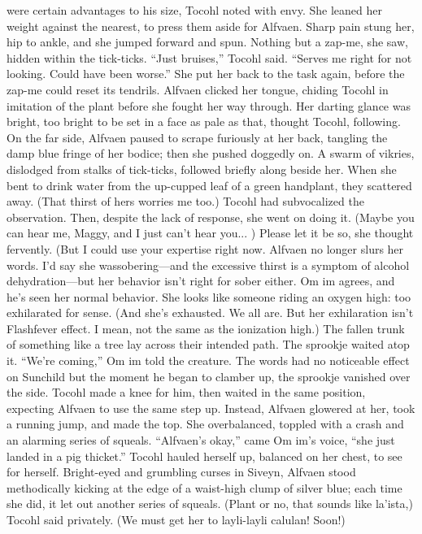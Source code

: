 \documentclass[9pt]{article}
\begin{document}
were certain advantages to his size, Tocohl noted with envy. She leaned her weight against the nearest, to
press them aside for Alfvaen. Sharp pain stung her, hip to ankle, and she jumped forward and spun.
Nothing but a zap-me, she saw, hidden within the tick-ticks. “Just bruises,” Tocohl said. “Serves me right
for not looking. Could have been worse.” She put her back to the task again, before the zap-me could
reset its tendrils.
Alfvaen clicked her tongue, chiding Tocohl in imitation of the plant before she fought her way
through. Her darting glance was bright, too bright to be set in a face as pale as that, thought Tocohl,
following.
On the far side, Alfvaen paused to scrape furiously at her back, tangling the damp blue fringe of her
bodice; then she pushed doggedly on. A swarm of vikries, dislodged from stalks of tick-ticks, followed
briefly along beside her. When she bent to drink water from the up-cupped leaf of a green handplant,
they scattered away.
(That thirst of hers worries me too.) Tocohl had subvocalized the observation. Then, despite the lack
of response, she went on doing it. (Maybe you can hear me, Maggy, and I just can’t hear you... ) Please
let it be so, she thought fervently.
(But I could use your expertise right now. Alfvaen no longer slurs her words. I’d say she wassobering—and the excessive thirst is a symptom of alcohol dehydration—but her behavior isn’t right for
sober either. Om im agrees, and he’s seen her normal behavior. She looks like someone riding an oxygen
high: too exhilarated for sense.
(And she’s exhausted. We all are. But her exhilaration isn’t Flashfever effect. I mean, not the same as
the ionization high.)
The fallen trunk of something like a tree lay across their intended path. The sprookje waited atop it.
“We’re coming,” Om im told the creature. The words had no noticeable effect on Sunchild but the
moment he began to clamber up, the sprookje vanished over the side. Tocohl made a knee for him, then
waited in the same position, expecting Alfvaen to use the same step up.
Instead, Alfvaen glowered at her, took a running jump, and made the top. She overbalanced, toppled
with a crash and an alarming series of squeals. “Alfvaen’s okay,” came Om im’s voice, “she just landed
in a pig thicket.”
Tocohl hauled herself up, balanced on her chest, to see for herself. Bright-eyed and grumbling curses
in Siveyn, Alfvaen stood methodically kicking at the edge of a waist-high clump of silver blue; each time
she did, it let out another series of squeals. (Plant or no, that sounds like la’ista,) Tocohl said privately.
(We must get her to layli-layli calulan! Soon!)
\end{document}
